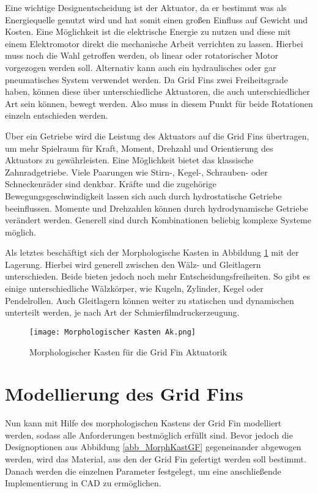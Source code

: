 Eine wichtige Designentscheidung ist der Aktuator, da er bestimmt was als Energiequelle genutzt wird und hat somit einen großen Einfluss auf Gewicht und Kosten. Eine Möglichkeit ist die elektrische Energie zu nutzen und diese mit einem Elektromotor direkt die mechanische Arbeit verrichten zu lassen. Hierbei muss noch die Wahl getroffen werden, ob linear oder rotatorischer Motor vorgezogen werden soll. Alternativ kann auch ein hydraulisches oder gar pneumatisches System verwendet werden. Da Grid Fins zwei Freiheitsgrade haben, können diese über unterschiedliche Aktuatoren, die auch unterschiedlicher Art sein können, bewegt werden. Also muss in diesem Punkt für beide Rotationen einzeln entschieden werden.

Über ein Getriebe wird die Leistung des Aktuators auf die Grid Fins übertragen, um mehr Spielraum für Kraft, Moment, Drehzahl und Orientierung des Aktuators zu gewährleisten. Eine Möglichkeit bietet das klassische Zahnradgetriebe. Viele Paarungen wie Stirn-, Kegel-, Schrauben- oder Schneckenräder sind denkbar. Kräfte und die zugehörige Bewegungsgeschwindigkeit lassen sich auch durch hydrostatische Getriebe beeinflussen. Momente und Drehzahlen können durch hydrodynamische Getriebe verändert werden. Generell sind durch Kombinationen beliebig komplexe Systeme möglich.

Als letztes beschäftigt sich der Morphologische Kasten in Abbildung \ref{abb_MorphKastAk} mit der Lagerung. Hierbei wird generell zwischen den Wälz- und Gleitlagern unterschieden. Beide bieten jedoch noch mehr Entscheidungsfreiheiten. So gibt es einige unterschiedliche Wälzkörper, wie Kugeln, Zylinder, Kegel oder Pendelrollen. Auch Gleitlagern können weiter zu statischen und dynamischen unterteilt werden, je nach Art der Schmierfilmdruckerzeugung.
\begin{figure}[h]
	\centering
	\texttt{[image: Morphologischer Kasten Ak.png]}
	\caption{Morphologischer Kasten für die Grid Fin Aktuatorik}
	\label{abb_MorphKastAk}
\end{figure}
\newpage
\section{Modellierung des Grid Fins}
Nun kann mit Hilfe des morphologischen Kastens der Grid Fin modelliert werden, sodass alle Anforderungen bestmöglich erfüllt sind. Bevor jedoch die Designoptionen aus Abbildung \ref{abb_MorphKastGF} gegeneinander abgewogen werden, wird das Material, aus den der Grid Fin gefertigt werden soll bestimmt. Danach werden die einzelnen Parameter festgelegt, um eine anschließende Implementierung in CAD zu ermöglichen.
